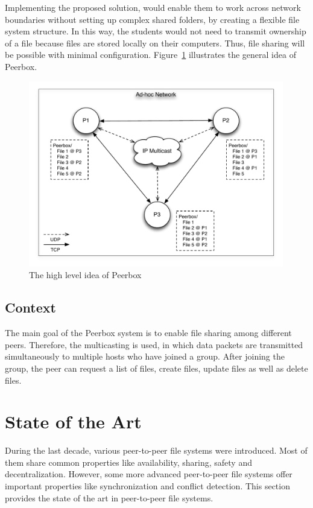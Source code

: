 Implementing the proposed solution, would  enable them to work across network boundaries without setting up complex shared folders, by creating a flexible file system structure. In this way, the students would not need to transmit ownership of a file because  files are stored locally on their computers. Thus, file sharing will be possible with minimal configuration. Figure~\ref{fig:idea} illustrates the general idea of Peerbox.
 
\begin{figure}[H]
\begin{center}
\includegraphics[height=3.2in]{figures/idea.pdf}
\caption{The high level idea of Peerbox}
\label{fig:idea}
\end{center}
\end{figure}



\subsection{Context}
The main goal of the Peerbox system is to enable file sharing among different peers. Therefore, the multicasting is used, in which data packets are transmitted simultaneously to multiple hosts who have joined a group. 
After joining the group, the peer can request a list of files, create files, update  files as well as delete files.

\clearpage
\section{State of the Art}

During the last decade, various peer-to-peer file systems were introduced. Most of them share common properties like availability, sharing, safety and decentralization. However, some more advanced peer-to-peer file systems offer important properties like synchronization and conflict detection. This section provides the state of the art in peer-to-peer file systems.

